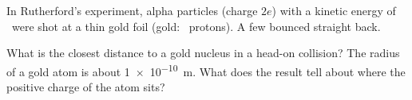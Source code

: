 In Rutherford's experiment, alpha particles (charge $2e$) with a kinetic energy of \EkO\ were shot at a thin gold foil (gold: \ZO\ protons). A few bounced straight back.

\begin{abcliste}
\abc What is the closest distance to a gold nucleus in a head-on collision?
\abc The radius of a gold atom is about \SI{1e-10}{\meter}. What does the result tell about where the positive charge of the atom sits?
\end{abcliste}
